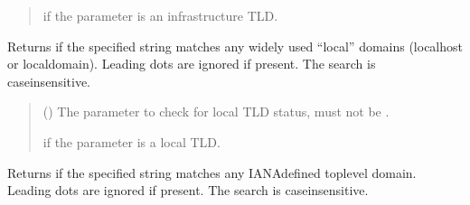 \documentclass[letterpaper,10pt,english]{sphinxmanual}
\begin{document}
\begin{fulllineitems}
\begin{fulllineitems}
\begin{quote}
\begin{description}
\sphinxAtStartPar
{} if the parameter is an infrastructure TLD.

\end{description}\end{quote}

\end{fulllineitems}


\begin{fulllineitems}
\label{\detokenize{apache_commons_validator_python.routines:apache_commons_validator_python.routines.domain_validator.DomainValidator.is_valid_local_tld}}
\pysigstartsignatures
{}
\pysigstopsignatures
\sphinxAtStartPar
Returns  if the specified string matches any widely used “local” domains
(localhost or localdomain). Leading dots are ignored if present. The search is
case\sphinxhyphen{}insensitive.
\begin{quote}\begin{description}
\sphinxAtStartPar
{} () \textendash{} The parameter to check for local TLD status, must not be .

\sphinxAtStartPar
{} if the parameter is a local TLD.

\end{description}\end{quote}

\end{fulllineitems}


\begin{fulllineitems}
\label{\detokenize{apache_commons_validator_python.routines:apache_commons_validator_python.routines.domain_validator.DomainValidator.is_valid_tld}}
\pysigstartsignatures
{}
\pysigstopsignatures
\sphinxAtStartPar
Returns  if the specified string matches any IANA\sphinxhyphen{}defined top\sphinxhyphen{}level
domain. Leading dots are ignored if present. The search is case\sphinxhyphen{}insensitive.


\end{fulllineitems}
\end{fulllineitems}
\end{document}
